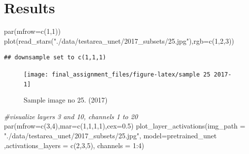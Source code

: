 \documentclass[
]{article}
\newenvironment{Shaded}{\begin{snugshade}}{\end{snugshade}}
\newcommand{\AttributeTok}[1]{\textcolor[rgb]{0.77,0.63,0.00}{#1}}
\newcommand{\CommentTok}[1]{\textcolor[rgb]{0.56,0.35,0.01}{\textit{#1}}}
\newcommand{\DecValTok}[1]{\textcolor[rgb]{0.00,0.00,0.81}{#1}}
\newcommand{\FloatTok}[1]{\textcolor[rgb]{0.00,0.00,0.81}{#1}}
\newcommand{\FunctionTok}[1]{\textcolor[rgb]{0.00,0.00,0.00}{#1}}
\newcommand{\NormalTok}[1]{#1}
\newcommand{\SpecialCharTok}[1]{\textcolor[rgb]{0.00,0.00,0.00}{#1}}
\newcommand{\StringTok}[1]{\textcolor[rgb]{0.31,0.60,0.02}{#1}}
\begin{document}
\hypertarget{results}{%
\section{Results}\label{results}}

\begin{Shaded}
\begin{Highlighting}[]
\FunctionTok{par}\NormalTok{(}\AttributeTok{mfrow=}\FunctionTok{c}\NormalTok{(}\DecValTok{1}\NormalTok{,}\DecValTok{1}\NormalTok{))}
\FunctionTok{plot}\NormalTok{(}\FunctionTok{read\_stars}\NormalTok{(}\StringTok{"./data/testarea\_unet/2017\_subsets/25.jpg"}\NormalTok{),}\AttributeTok{rgb=}\FunctionTok{c}\NormalTok{(}\DecValTok{1}\NormalTok{,}\DecValTok{2}\NormalTok{,}\DecValTok{3}\NormalTok{))}
\end{Highlighting}
\end{Shaded}

\begin{verbatim}
## downsample set to c(1,1,1)
\end{verbatim}

\begin{figure}

{\centering \texttt{[image: final\_assignment\_files/figure-latex/sample 25 2017-1]} 

}

\caption{Sample image no 25. (2017)}\label{fig:sample 25 2017}
\end{figure}

\begin{Shaded}
\begin{Highlighting}[]
\CommentTok{\#visualize layers 3 and 10, channels 1 to 20}
\FunctionTok{par}\NormalTok{(}\AttributeTok{mfrow=}\FunctionTok{c}\NormalTok{(}\DecValTok{3}\NormalTok{,}\DecValTok{4}\NormalTok{),}\AttributeTok{mar=}\FunctionTok{c}\NormalTok{(}\DecValTok{1}\NormalTok{,}\DecValTok{1}\NormalTok{,}\DecValTok{1}\NormalTok{,}\DecValTok{1}\NormalTok{),}\AttributeTok{cex=}\FloatTok{0.5}\NormalTok{)}
\FunctionTok{plot\_layer\_activations}\NormalTok{(}\AttributeTok{img\_path =} \StringTok{"./data/testarea\_unet/2017\_subsets/25.jpg"}\NormalTok{, }
                       \AttributeTok{model=}\NormalTok{pretrained\_unet ,}\AttributeTok{activations\_layers =} \FunctionTok{c}\NormalTok{(}\DecValTok{2}\NormalTok{,}\DecValTok{3}\NormalTok{,}\DecValTok{5}\NormalTok{), }\AttributeTok{channels =} \DecValTok{1}\SpecialCharTok{:}\DecValTok{4}\NormalTok{)}
\end{Highlighting}
\end{Shaded}
\end{document}
